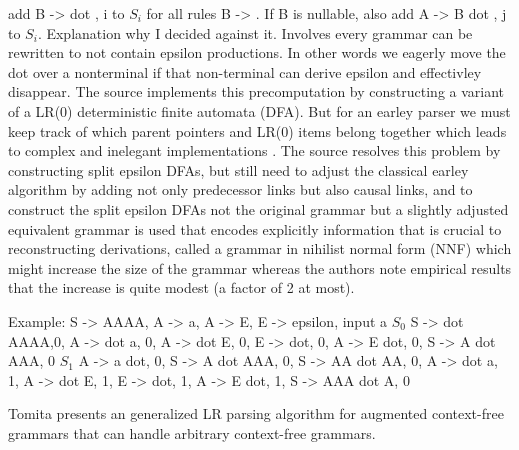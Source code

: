 \begin{isabellebody}
\begin{isamarkuptext}
add B -> dot \gamma, i to $S_i$ for all rules B -> \gamma. If B is nullable, also add A -> \alpha B dot \beta, j
to $S_i$. Explanation why I decided against it. Involves every grammar can be rewritten to not contain epsilon
productions. In other words we eagerly move the dot over a nonterminal if that non-terminal can derive epsilon
and effectivley disappear. The source implements this precomputation by constructing a variant of 
a LR(0) deterministic finite automata (DFA). But for an earley parser we must keep track of which parent
pointers and LR(0) items belong together which leads to complex and inelegant implementations \cite{McLean:1996}.
The source resolves this problem by constructing split epsilon DFAs, but still need to adjust the classical
earley algorithm by adding not only predecessor links but also causal links, and to construct the split
epsilon DFAs not the original grammar but a slightly adjusted equivalent grammar is used that encodes
explicitly information that is crucial to reconstructing derivations, called a grammar in nihilist normal form (NNF)
which might increase the size of the grammar whereas the authors note empirical results that the increase
is quite modest (a factor of 2 at most).

Example:
S -> AAAA, A -> a, A -> E, E -> epsilon, input a
$S_0$ S -> dot AAAA,0, A -> dot a, 0, A -> dot E, 0, E -> dot, 0, A -> E dot, 0, S -> A dot AAA, 0
$S_1$ A -> a dot, 0, S -> A dot AAA, 0, S -> AA dot AA, 0, A -> dot a, 1, A -> dot E, 1, E -> dot, 1, A -> E dot, 1, S -> AAA dot A, 0%
\end{isamarkuptext}\isamarkuptrue%
%
\isadelimdocument
%
\endisadelimdocument
%
\isatagdocument
%
\isamarkuptrue%
%
\isamarkuptrue%
%
\endisatagdocument
{\isafolddocument}%
%
\isadelimdocument
%
\endisadelimdocument
%
\begin{isamarkuptext}%
Tomita \cite{Tomita:1987} presents an generalized LR parsing algorithm for augmented
context-free grammars that can handle arbitrary context-free grammars.


\end{isamarkuptext}
\end{isabellebody}
